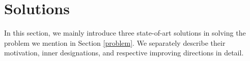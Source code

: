 \section{Solutions}
In this section, we mainly introduce three state-of-art solutions in solving the problem we mention in Section \ref{problem}. We separately describe their motivation, inner designations, and respective improving directions in detail.



